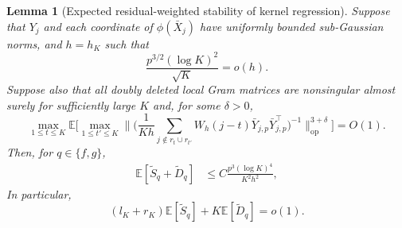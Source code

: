 \documentclass[12pt]{article}
\def\E{\mathbb{E}}
\newtheorem{lemma}[theorem]{Lemma}
\numberwithin{equation}{section}
\begin{document}
\begin{lemma}[Expected residual-weighted stability of kernel regression]
\label{lem:tvcm-weighted-stability}
Suppose that $Y_j$ and each coordinate of $\phi(\bar X_j)$ have uniformly bounded sub-Gaussian norms, and $h=h_K$ such that
\begin{equation}
\label{eq:tvcm-weighted-bandwidth}
\frac{p^{3/2}(\log K)^2}{\sqrt K}=o(h).
\end{equation}
Suppose also that all doubly deleted local Gram matrices are
nonsingular almost surely for sufficiently large $K$ and,
for some $\delta>0$,
\begin{equation}
\label{eq:tvcm-weighted-inverse}
\max_{1\leq t\leq K}
\E\bigg[
\max_{1\leq t'\leq K}
\Big\|
\big(
\frac1{Kh}
\sum_{j\notin r_t\cup r_{t'}}
W_h(j-t)\bar Y_{j,p}\bar Y_{j,p}^\top
\big)^{-1}
\Big\|_{\mathrm{op}}^{3+\delta}
\bigg]
=O(1).
\end{equation}
Then, for $q\in\{f,g\}$,
\begin{align}
\E[\tilde S_q+\tilde D_q]
&\leq
C\frac{p^3(\log K)^4}{K^2h^2},
\label{eq:tvcm-weighted-stability-rate}
\end{align}
In particular,
\[
(l_K+r_K)\E[\tilde S_q]+K\E[\tilde D_q]=o(1).
\]
\end{lemma}
\end{document}
